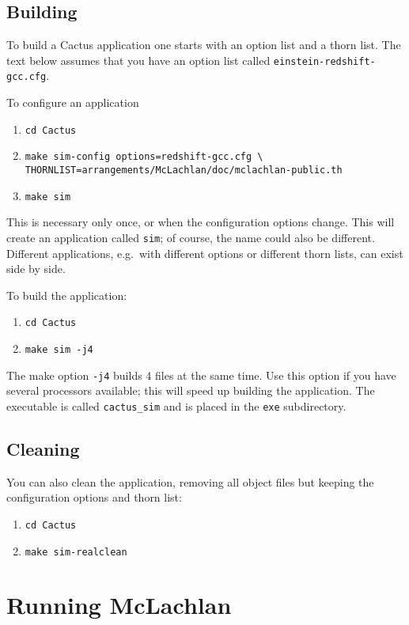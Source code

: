 \documentclass[11pt, tightenlines]{revtex4}
\newcommand{\code}[1]{\texttt{#1}}
\begin{document}
\subsection{Building}

To build a Cactus application one starts with an option list and a
thorn list.  The text below assumes that you have an option list
called \code{einstein-redshift-gcc.cfg}.

To configure an application
\begin{enumerate}
\item\verb+cd Cactus+
\item\verb+make sim-config options=redshift-gcc.cfg \+\\
  \verb+THORNLIST=arrangements/McLachlan/doc/mclachlan-public.th+
\item\verb+make sim+
\end{enumerate}
This is necessary only once, or when the configuration options change.
This will create an application called \code{sim}; of course, the name
could also be different.  Different applications, e.g.\ with different
options or different thorn lists, can exist side by side.

To build the application:
\begin{enumerate}
\item\verb+cd Cactus+
\item\verb+make sim -j4+
\end{enumerate}
The make option \code{-j4} builds 4 files at the same time.  Use this
option if you have several processors available; this will speed up
building the application.  The executable is called \code{cactus\_sim}
and is placed in the \code{exe} subdirectory.

\subsection{Cleaning}

You can also clean the application, removing all object files but
keeping the configuration options and thorn list:
\begin{enumerate}
\item\verb+cd Cactus+
\item\verb+make sim-realclean+
\end{enumerate}



\section{Running McLachlan}
\end{document}
